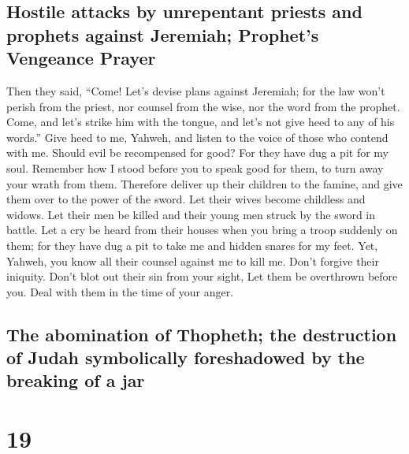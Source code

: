 \hypertarget{hostile-attacks-by-unrepentant-priests-and-prophets-against-jeremiah-prophets-vengeance-prayer}{%
\subsection{Hostile attacks by unrepentant priests and prophets against
Jeremiah; Prophet's Vengeance
Prayer}\label{hostile-attacks-by-unrepentant-priests-and-prophets-against-jeremiah-prophets-vengeance-prayer}}

 Then they said, ``Come! Let's devise plans against
Jeremiah; for the law won't perish from the priest, nor counsel from the
wise, nor the word from the prophet. Come, and let's strike him with the
tongue, and let's not give heed to any of his words.'' 
Give heed to me, Yahweh, and listen to the voice of those who contend
with me.  Should evil be recompensed for good? For they
have dug a pit for my soul. Remember how I stood before you to speak
good for them, to turn away your wrath from them. 
Therefore deliver up their children to the famine, and give them over to
the power of the sword. Let their wives become childless and widows. Let
their men be killed and their young men struck by the sword in battle.
 Let a cry be heard from their houses when you bring a
troop suddenly on them; for they have dug a pit to take me and hidden
snares for my feet.  Yet, Yahweh, you know all their
counsel against me to kill me. Don't forgive their iniquity. Don't blot
out their sin from your sight, Let them be overthrown before you. Deal
with them in the time of your anger.

\hypertarget{the-abomination-of-thopheth-the-destruction-of-judah-symbolically-foreshadowed-by-the-breaking-of-a-jar}{%
\subsection{The abomination of Thopheth; the destruction of Judah
symbolically foreshadowed by the breaking of a
jar}\label{the-abomination-of-thopheth-the-destruction-of-judah-symbolically-foreshadowed-by-the-breaking-of-a-jar}}

\hypertarget{section-18}{%
\section{19}\label{section-18}}

